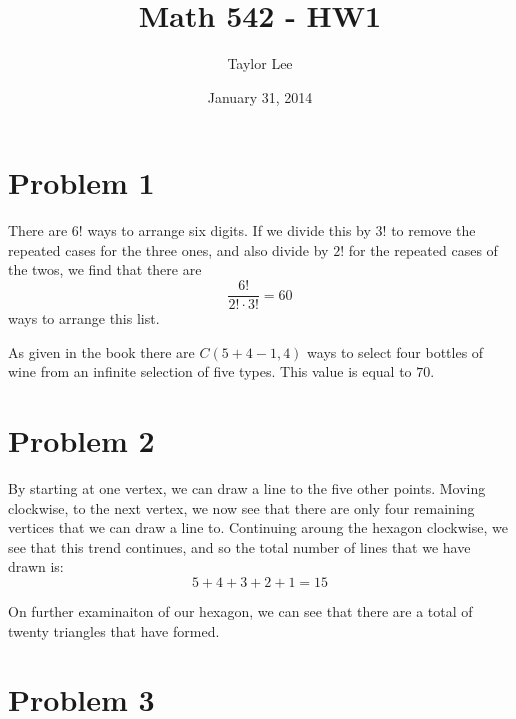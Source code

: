 \documentclass[12pt]{article}
\begin{document}
\title{ Math 542 - HW1}
\date{January 31, 2014}         %
\author{Taylor Lee}      %
\maketitle                      %

\lstset{breaklines=true}

\setcounter{secnumdepth}{0}

\section*{Problem 1}
There are $6!$ ways to arrange six digits. If we divide this by $3!$ to remove the repeated cases for the three ones, and also divide by $2!$ for the repeated cases of the twos, we find that there are
\[
\frac{6!}{2! \cdot 3!} = 60
\]
ways to arrange this list.

As given in the book there are $C(5 + 4 -1,4)$ ways to select four bottles of wine from an infinite selection of five types. This value is equal to $70$.

\section*{Problem 2}
By starting at one vertex, we can draw a line to the five other points. Moving clockwise, to the next vertex, we now see that there are only four remaining vertices that we can draw a line to. Continuing aroung the hexagon clockwise, we see that this trend continues, and so the total number of lines that we have drawn is:
\[
5 + 4 + 3 + 2 + 1 = 15
\] 

On further examinaiton of our hexagon, we can see that there are a total of twenty triangles that have formed.


\section*{Problem 3}
\end{document}
